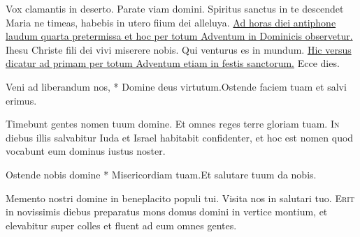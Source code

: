 \begin{multicols*}{2}
\newline \V Vox clamantis in deserto.
\newline \R Parate viam domini.
 Spiritus sanctus in te descendet Maria ne timeas, habebis in utero fiium dei alleluya.
\newline \ul{Ad horas diei antiphone laudum quarta pretermissa et hoc per totum Adventum in Dominicis observetur.}
 \R Ihesu Christe fili dei vivi miserere nobis. \V Qui venturus es in mundum. \ul{Hic versus dicatur ad primam per totum Adventum etiam in festis sanctorum.}
 Ecce dies.
\begin{responsory-breve}
{Veni ad liberandum nos, * Domine deus virtutum.}{Ostende faciem tuam et salvi erimus.}
\end{responsory-breve}
\V Timebunt gentes nomen tuum domine. \R Et omnes reges terre gloriam tuam.
\lettrine[lines=2]{\zallmancaps \color{Red} I}{n} diebus illis salvabitur Iuda et Israel habitabit confidenter, et hoc est nomen quod vocabunt eum dominus iustus noster.
\begin{responsory-breve}
{Ostende nobis domine * Misericordiam tuam.}{Et salutare tuum da nobis.}
\end{responsory-breve}
\V Memento nostri domine in beneplacito populi tui. \R Visita nos in salutari tuo.
\lettrine[lines=2]{\zallmancaps \color{Blue} E}{rit} in novissimis diebus preparatus mons domus domini in vertice montium, et elevabitur super colles et fluent ad eum omnes gentes.

\end{multicols*}
